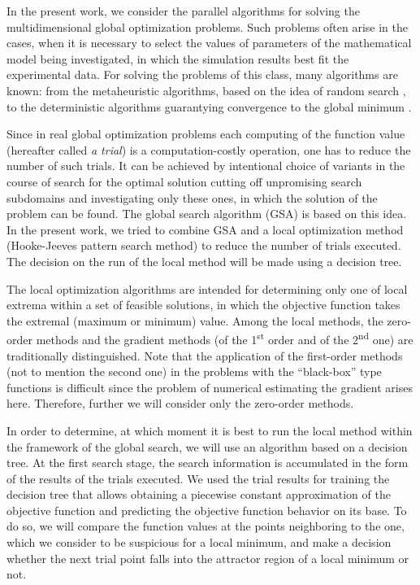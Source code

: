 \documentclass{svproc}
\begin{document}
In the present work, we consider the parallel algorithms for solving the multidimensional global optimization problems. Such problems often arise in the cases, when it is necessary to select the values  of parameters of the mathematical model being investigated, in which the simulation results best fit the experimental data. For solving the problems of this class, many algorithms are known: from the metaheuristic algorithms, based on the  idea of random search \cite{Ferreiro2013,Garcia2014,Langdon2011}, to the deterministic algorithms guarantying convergence to the global minimum \cite{Evtushenko2009,He2008,Paulavicius2011}.  

Since in real global optimization problems each computing of the function value (hereafter called  \textit{a trial}) is a computation-costly operation, one has to reduce the number of such trials. It  can be achieved by intentional choice of variants in the course of search for the optimal solution cutting  off unpromising search subdomains and investigating only these ones, in which the solution of the  problem can be found. The global search algorithm (GSA) is based on this idea. In  the present work, we tried to combine GSA and a local optimization method (Hooke-Jeeves pattern search method) to reduce the number of trials executed. The decision on the run of the local method will be made using a decision tree.

The local optimization algorithms are intended for determining only one of local extrema within a set  of feasible solutions, in which the objective function takes the extremal (maximum or minimum) value.  Among the local methods,  the zero-order methods and the gradient methods (of the 1\textsuperscript{st} order and of the  2\textsuperscript{nd} one) are traditionally distinguished. Note that the application of the first-order methods (not to mention the second one) in the problems  with the ``black-box'' type functions is difficult since the problem of numerical estimating the gradient arises here. Therefore, further we will consider only the zero-order methods. 

In order to determine,  at which moment it is best to run the local method within the framework of the  global search, we will use an algorithm based on a decision tree. At the first search stage, the search information is accumulated in the form of the results of the trials  executed. We used the trial results for training the decision tree that allows obtaining a piecewise constant approximation of the objective function and predicting the objective function behavior on its base.  To do so, we will compare the function values at the points neighboring to the one, which we consider  to be suspicious for a local minimum, and make a decision  whether the next trial point falls into the attractor region of a local minimum or not.
\end{document}

